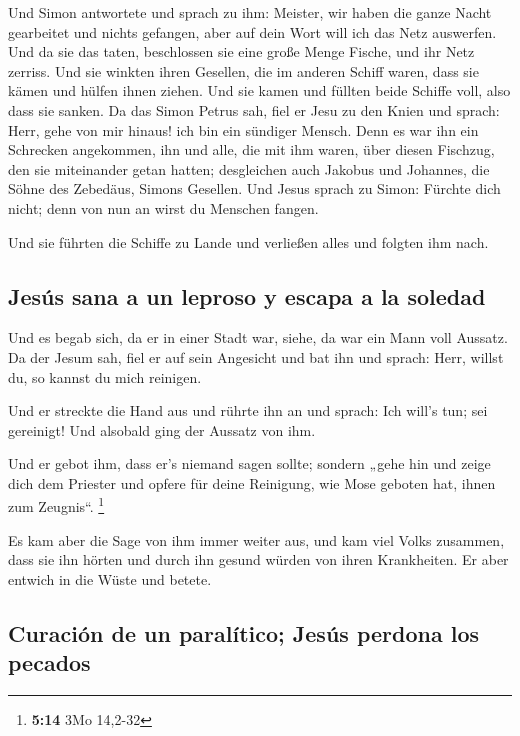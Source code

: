  Und Simon antwortete und sprach zu ihm: Meister, wir
haben die ganze Nacht gearbeitet und nichts gefangen, aber auf dein Wort
will ich das Netz auswerfen.  Und da sie das taten,
beschlossen sie eine große Menge Fische, und ihr Netz zerriss.
 Und sie winkten ihren Gesellen, die im anderen Schiff
waren, dass sie kämen und hülfen ihnen ziehen. Und sie kamen und füllten
beide Schiffe voll, also dass sie sanken.  Da das Simon
Petrus sah, fiel er Jesu zu den Knien und sprach: Herr, gehe von mir
hinaus! ich bin ein sündiger Mensch.  Denn es war ihn ein
Schrecken angekommen, ihn und alle, die mit ihm waren, über diesen
Fischzug, den sie miteinander getan hatten;  desgleichen
auch Jakobus und Johannes, die Söhne des Zebedäus, Simons Gesellen. Und
Jesus sprach zu Simon: Fürchte dich nicht; denn von nun an wirst du
Menschen fangen.

 Und sie führten die Schiffe zu Lande und verließen alles
und folgten ihm nach.

\hypertarget{jesuxfas-sana-a-un-leproso-y-escapa-a-la-soledad}{%
\subsection{Jesús sana a un leproso y escapa a la
soledad}\label{jesuxfas-sana-a-un-leproso-y-escapa-a-la-soledad}}

 Und es begab sich, da er in einer Stadt war, siehe, da
war ein Mann voll Aussatz. Da der Jesum sah, fiel er auf sein Angesicht
und bat ihn und sprach: Herr, willst du, so kannst du mich reinigen.

 Und er streckte die Hand aus und rührte ihn an und
sprach: Ich will's tun; sei gereinigt! Und alsobald ging der Aussatz von
ihm.

 Und er gebot ihm, dass er's niemand sagen sollte;
sondern „gehe hin und zeige dich dem Priester und opfere für deine
Reinigung, wie Mose geboten hat, ihnen zum Zeugnis``. \footnote{\textbf{5:14}
  3Mo 14,2-32}

 Es kam aber die Sage von ihm immer weiter aus, und kam
viel Volks zusammen, dass sie ihn hörten und durch ihn gesund würden von
ihren Krankheiten.  Er aber entwich in die Wüste und
betete.

\hypertarget{curaciuxf3n-de-un-paraluxedtico-jesuxfas-perdona-los-pecados}{%
\subsection{Curación de un paralítico; Jesús perdona los
pecados}\label{curaciuxf3n-de-un-paraluxedtico-jesuxfas-perdona-los-pecados}}

